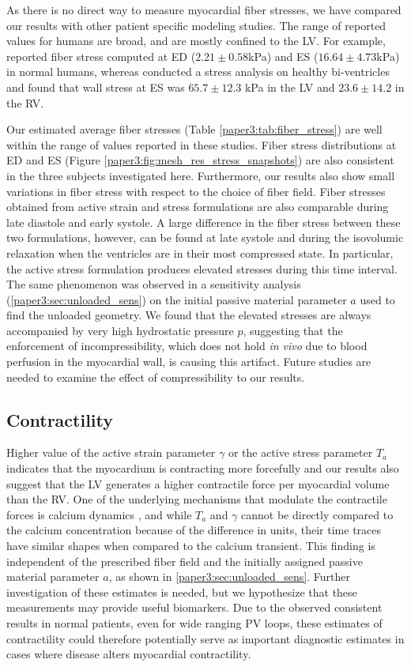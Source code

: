As there is no direct way to measure myocardial fiber stresses, we
have compared our results with other patient specific modeling
studies. The range of reported values for humans are
broad, and are mostly confined to the LV. For example,
\citep{genet2014distribution} reported fiber stress computed at ED
($2.21 \pm 0.58$kPa) and ES ($16.64 \pm 4.73 $kPa) in normal humans,
whereas \citep{scardulla2016evaluation} conducted a stress analysis on
healthy bi-ventricles and found that wall stress at ES was $65.7 \pm
12.3$ kPa in the LV and $23.6 \pm 14.2$ in the RV. 

Our estimated average fiber stresses (Table \ref{paper3:tab:fiber_stress})
are well within the range of values reported in these studies. Fiber
stress distributions at ED and ES (Figure
\ref{paper3:fig:mesh_res_stress_snapshots}) are also consistent in the three
subjects investigated here. Furthermore, our results also show small
variations in fiber stress with respect to the choice of fiber
field. Fiber stresses obtained from active strain and stress
formulations are also comparable during late diastole and early
systole. A large difference in the fiber stress between these two
formulations, however, can be found at late systole and during the
isovolumic relaxation when the ventricles are in their most compressed
state. In particular, the active stress formulation produces elevated
stresses during this time interval. The same phenomenon was observed
in a sensitivity analysis (\ref{paper3:sec:unloaded_sens}) on the initial
passive material parameter $a$ used to find the unloaded geometry. We
found that the elevated stresses are always accompanied by very
high hydrostatic pressure $p$, suggesting that the enforcement of
incompressibility, which does not hold {\it in vivo} due to blood
perfusion in the myocardial wall, is causing this artifact.  Future studies are 
needed to examine the effect of compressibility to our results.  

\subsection{Contractility}
Higher value of the active strain parameter $\gamma$ or the active
stress parameter $T_a$ indicates that the myocardium is contracting
more forcefully and our results also suggest that the
LV generates a higher contractile force per myocardial volume than the RV. 
One of the underlying mechanisms that modulate the contractile forces
is calcium dynamics \citep{hunter1998modelling,
  ambrosi2011electromechanical}, and while $T_a$ and $\gamma$ cannot be
directly compared to the calcium concentration because of the
difference in units, their time traces have similar shapes when
compared to the calcium transient. 
This finding is independent of  the prescribed fiber field and the initially assigned passive material
parameter $a$, as shown in \ref{paper3:sec:unloaded_sens}.  Further investigation of these estimates is needed, but we hypothesize that these measurements may provide useful biomarkers.  Due to the observed  consistent results in normal patients, even for wide ranging PV loops,  these estimates of contractility could therefore potentially serve as important diagnostic
estimates in cases where disease alters myocardial contractility.
 
